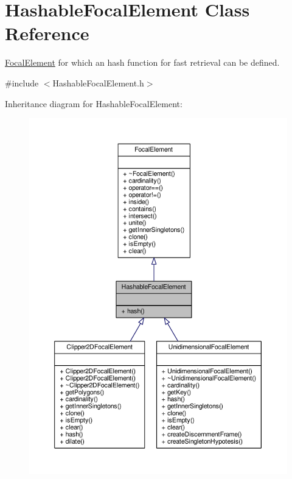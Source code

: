 \hypertarget{classHashableFocalElement}{}\section{Hashable\+Focal\+Element Class Reference}
\label{classHashableFocalElement}


\hyperlink{classFocalElement}{Focal\+Element} for which an hash function for fast retrieval can be defined.  




{\ttfamily \#include $<$Hashable\+Focal\+Element.\+h$>$}



Inheritance diagram for Hashable\+Focal\+Element\+:\nopagebreak
\begin{figure}[H]
\begin{center}
\leavevmode
\includegraphics[width=350pt]{classHashableFocalElement__inherit__graph}
\end{center}
\end{figure}


